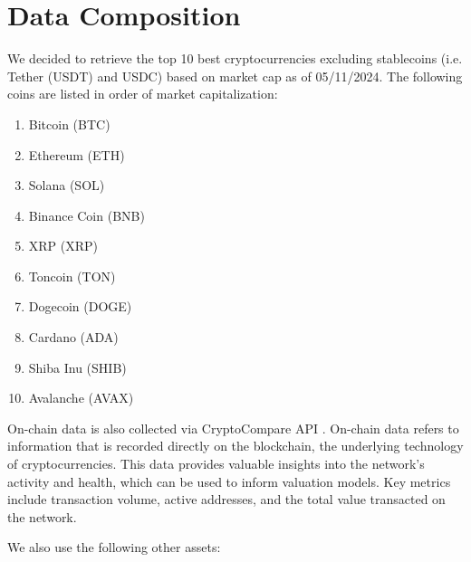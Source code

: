 \section{Data Composition}

We decided to retrieve the top 10 best cryptocurrencies excluding stablecoins (i.e. Tether (USDT) and USDC) based on market cap as of 05/11/2024. The following coins are listed in order of market capitalization: 

\begin{enumerate}[itemsep=1em]
    \item Bitcoin (BTC)
    \item Ethereum (ETH)
    \item Solana (SOL)
    \item Binance Coin (BNB)
    \item XRP (XRP)
    \item Toncoin (TON)
    \item Dogecoin (DOGE)
    \item Cardano (ADA)
    \item Shiba Inu (SHIB)
    \item Avalanche (AVAX)
\end{enumerate}


On-chain data is also collected via CryptoCompare API \cite{cryptocompare_api}. On-chain data refers to information that is recorded directly on the blockchain, the underlying technology of cryptocurrencies. This data provides valuable insights into the network's activity and health, which can be used to inform valuation models. Key metrics include transaction volume, active addresses, and the total value transacted on the network.

We also use the following other assets:

